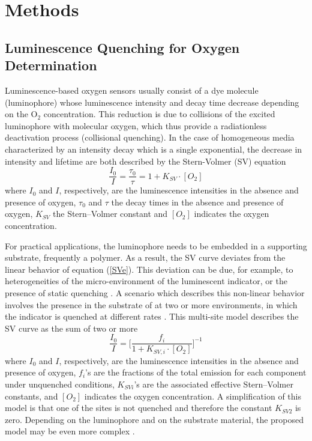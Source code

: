 \documentclass[9pt,twocolumn,twoside,pdftex]{optica}
\begin{document}
\section{Methods}
\label{sec:methods}

\subsection{Luminescence Quenching for Oxygen Determination}
\label{Theory}

Luminescence-based oxygen sensors usually consist of a dye molecule (luminophore) whose luminescence intensity and decay time decrease depending on the O$_2$ concentration. This reduction is due to collisions of the excited luminophore with molecular oxygen, which thus provide a radiationless deactivation process (collisional quenching). 
In the case of homogeneous media characterized by an intensity decay which is a single exponential, the decrease in intensity and lifetime are both described by the Stern-Volmer (SV) equation \cite{Lakowicz2006}
\begin{equation}
\frac{I_0}{I}=\frac{\tau_0}{\tau}=1+K_{SV} \cdot \left[O_2\right]
\label{SVe}
\end{equation}
where $I_0$ and $I$, respectively, are the luminescence intensities in the absence and presence of oxygen, $\tau_0$ and $\tau$ the decay times in the absence and presence of oxygen, $K_{SV}$ the Stern–Volmer constant and $\left[O_2\right]$ indicates the oxygen concentration.

For practical applications, the luminophore needs to be embedded in a supporting substrate, frequently a polymer. As a result, the SV curve deviates from the linear behavior of equation (\ref{SVe}). This deviation can be due, for example, to heterogeneities of the micro-environment of the luminescent indicator, or the presence of static quenching \cite{Wang2014}. A scenario which describes this non-linear behavior involves the presence in the substrate of at two or more environments, in which the indicator is quenched at different rates \cite{Carraway1991,Demas1995}. This multi-site model describes the SV curve as the sum of two or more
\begin{equation}
\frac{I_0}{I}=\bigg[
\frac{f_i}{1+K_{SV,i} \cdot \left[O_2\right]}
\bigg]^{-1}
\label{SVe2}
\end{equation}
where $I_0$ and $I$, respectively, are the luminescence intensities in the absence and presence of oxygen, $f_i$'s are the fractions of the total emission for each component under unquenched conditions, $K_{SVi}$'s are the associated effective Stern–Volmer constants, and $\left[O_2\right]$ indicates the oxygen concentration. A simplification of this model is that one of the sites is not quenched and therefore the constant $K_{SV2}$ is zero.
 Depending on the luminophore and on the substrate material, the proposed model may be even more complex \cite{Demas1995,Hartmann1995,Mills1999}.
\end{document}
